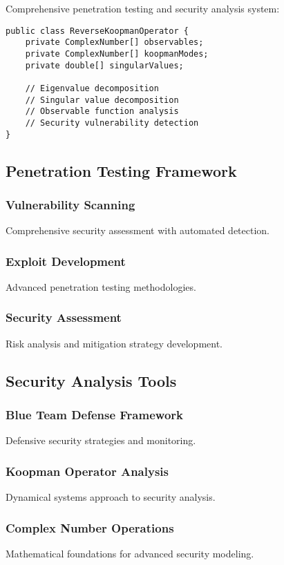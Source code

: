 \documentclass[11pt,a4paper]{article}
\begin{document}
Comprehensive penetration testing and security analysis system:

\begin{lstlisting}[caption=Reverse Koopman Operator Implementation]
public class ReverseKoopmanOperator {
    private ComplexNumber[] observables;
    private ComplexNumber[] koopmanModes;
    private double[] singularValues;

    // Eigenvalue decomposition
    // Singular value decomposition
    // Observable function analysis
    // Security vulnerability detection
}
\end{lstlisting}

\subsection{Penetration Testing Framework}

\subsubsection{Vulnerability Scanning}
Comprehensive security assessment with automated detection.

\subsubsection{Exploit Development}
Advanced penetration testing methodologies.

\subsubsection{Security Assessment}
Risk analysis and mitigation strategy development.

\subsection{Security Analysis Tools}

\subsubsection{Blue Team Defense Framework}
Defensive security strategies and monitoring.

\subsubsection{Koopman Operator Analysis}
Dynamical systems approach to security analysis.

\subsubsection{Complex Number Operations}
Mathematical foundations for advanced security modeling.
\end{document}
